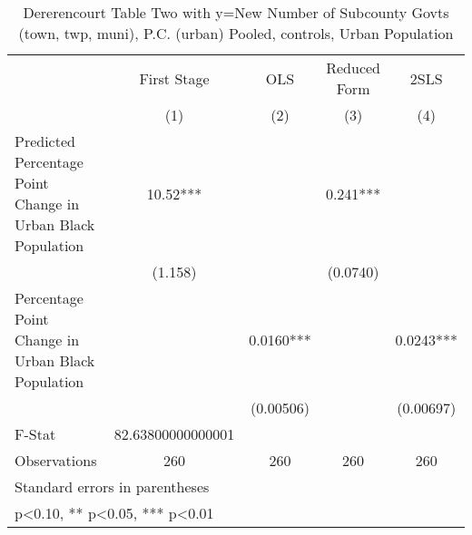 \begin{table}[htbp]\centering
\def\sym#1{\ifmmode^{#1}\else\(^{#1}\)\fi}
\caption{Dererencourt Table Two with y=New Number of Subcounty Govts (town, twp, muni), P.C. (urban)  Pooled,  controls, Urban Population}
\begin{tabular}{l*{4}{c}}
\toprule
                    & First Stage   &         OLS   &Reduced Form   &        2SLS   \\
                    &\multicolumn{1}{c}{(1)}   &\multicolumn{1}{c}{(2)}   &\multicolumn{1}{c}{(3)}   &\multicolumn{1}{c}{(4)}   \\
\midrule
Predicted Percentage Point Change in Urban Black Population&       10.52***&               &       0.241***&               \\
                    &     (1.158)   &               &    (0.0740)   &               \\
\addlinespace
Percentage Point Change in Urban Black Population&               &      0.0160***&               &      0.0243***\\
                    &               &   (0.00506)   &               &   (0.00697)   \\
\midrule
F-Stat              &82.63800000000001   &               &               &               \\
Observations        &         260   &         260   &         260   &         260   \\
\bottomrule
\multicolumn{5}{l}{\footnotesize Standard errors in parentheses}\\
\multicolumn{5}{l}{\footnotesize * p<0.10, ** p<0.05, *** p<0.01}\\
\end{tabular}
\end{table}
